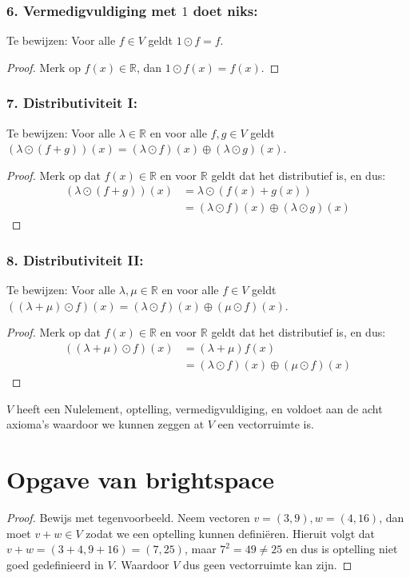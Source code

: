 \documentclass{article}
\newcommand{\R}{\mathbb{R}}
\begin{document}
\subsubsection*{6. Vermedigvuldiging met $1$ doet niks:}
Te bewijzen: Voor alle $f \in V$ geldt $1 \odot f = f$.
\begin{proof}
    Merk op $f(x) \in \R$, dan $1 \odot f(x) = f(x)$.
\end{proof}

\subsubsection*{7. Distributiviteit I:}
Te bewijzen: Voor alle $\lambda \in \R$ en voor alle $f, g \in V$ geldt $(\lambda \odot (f + g))(x) = (\lambda \odot f)(x) \oplus (\lambda \odot g)(x)$.
\begin{proof}
    Merk op dat $f(x) \in \R$ en voor $\R$ geldt dat het distributief is, en dus:
    \begin{align*}
        (\lambda \odot (f + g))(x) & = \lambda \odot (f(x) + g(x))                      \\
                                   & = (\lambda \odot f)(x) \oplus (\lambda \odot g)(x)
    \end{align*}
\end{proof}
\subsubsection*{8. Distributiviteit II:}
Te bewijzen: Voor alle $\lambda, \mu \in \R$ en voor alle $f \in V$ geldt $((\lambda + \mu) \odot f)(x) = (\lambda \odot f)(x) \oplus (\mu \odot f)(x)$.
\begin{proof}
    Merk op dat $f(x) \in \R$ en voor $\R$ geldt dat het distributief is, en dus:
    \begin{align*}
        ((\lambda + \mu) \odot f)(x) & = (\lambda + \mu)f(x)                          \\
                                     & = (\lambda \odot f)(x) \oplus (\mu \odot f)(x)
    \end{align*}
\end{proof}

$V$ heeft een Nulelement, optelling, vermedigvuldiging, en voldoet aan de acht axioma's
waardoor we kunnen zeggen at $V$ een vectorruimte is.

\section*{Opgave van brightspace}
\begin{proof}
    Bewijs met tegenvoorbeeld.
    Neem vectoren $v = (3, 9), w = (4, 16)$, dan moet $v + w \in V$ zodat we een optelling kunnen definiëren.
    Hieruit volgt dat $v + w = (3 + 4, 9 + 16) = (7, 25)$, maar $7^2 = 49 \neq 25$ en dus is optelling niet goed gedefinieerd in $V$.
    Waardoor $V$ dus geen vectorruimte kan zijn.
\end{proof}
\end{document}
